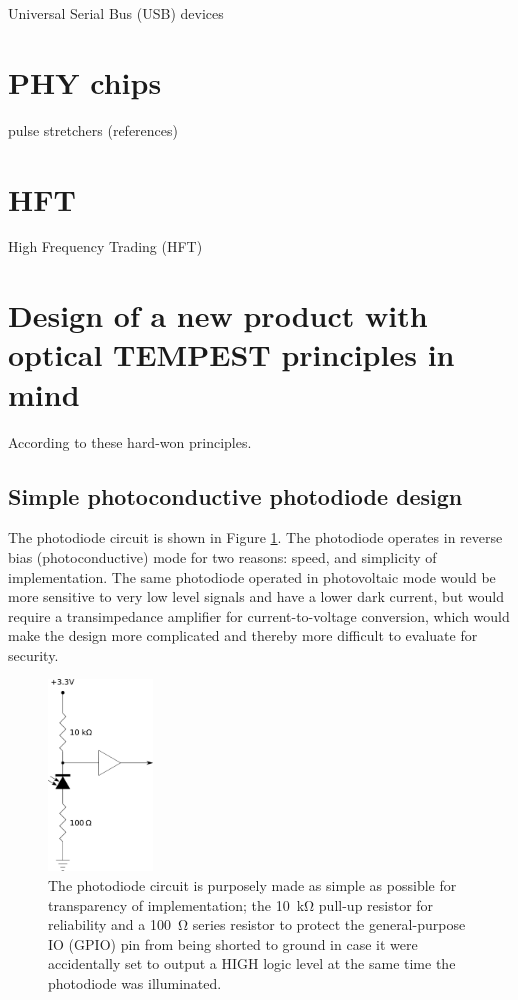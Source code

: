\documentclass[conference]{IEEEtran}
\begin{document}
Universal Serial Bus (USB) devices

\section{PHY chips}

pulse stretchers (references)

\section{HFT}

High Frequency Trading (HFT)

\section{Design of a new product with optical TEMPEST principles
in mind}

According to these hard-won principles.

\subsection{Simple photoconductive photodiode design}

The photodiode circuit is shown in Figure \ref{figure:photodiode_pullup}.
The photodiode operates in reverse bias (photoconductive) mode for two
reasons: speed, and simplicity of implementation. The same photodiode
operated in photovoltaic mode would be more sensitive to very low level
signals and have a lower dark current, but would require a transimpedance
amplifier for current-to-voltage conversion, which would make the design
more complicated and thereby more difficult to evaluate for security.

\begin{figure}[!t]
    \centering
	\includegraphics[height=2in]{graphics/photodiode_pullup_and_GPIO_protection.png}
	\caption{The photodiode circuit is purposely made as simple as possible
        for transparency of implementation; the \SI{10}{\kilo\ohm} pull-up
        resistor for reliability and a \SI{100}{\ohm} series resistor to
        protect the general-purpose IO (GPIO) pin from being shorted to
        ground in case it were accidentally set to output a HIGH logic level
        at the same time the photodiode was illuminated.}
	\label{figure:photodiode_pullup}
\end{figure}
\end{document}
